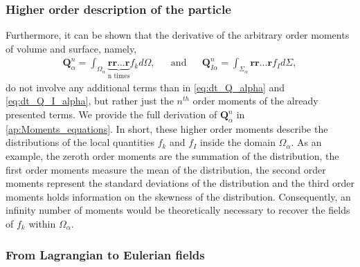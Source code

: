 \subsubsection*{Higher order description of the particle}
Furthermore, it can be shown that the derivative of the arbitrary order moments of volume and surface, namely,
\begin{align}
    \textbf{Q}_\alpha^n
    = \int_{\Omega_\alpha} \underbrace{
        \textbf{r}\textbf{r}\ldots\textbf{r}
    }_{
        \text{n times}
    }
    f_k d\Omega,
    && \text{and} &&
    \textbf{Q}_{I\alpha}^n
    = \int_{\Sigma_\alpha}
        \textbf{r}\textbf{r}\ldots\textbf{r}
    f_I d\Sigma,
    \label{eq:Q_n_definition}
\end{align} 
do not involve any additional terms than in \ref{eq:dt_Q_alpha} and \ref{eq:dt_Q_I_alpha}, but rather just the $n^{th}$ order moments of the already presented terms.
We provide the full derivation of $\textbf{Q}_\alpha^n$ in \ref{ap:Moments_equations}.
In short, these higher order moments describe the distributions of the local quantities $f_k$ and $f_I$ inside the domain $\Omega_\alpha$.
As an example, the zeroth order moments are the summation of the distribution, the first order moments measure the mean of the distribution, the second order moments represent the standard deviations of the distribution and the third order moments holds information on the skewness of the distribution. 
Consequently, an infinity number of moments would be theoretically necessary to recover the fields of $f_k$ within $\Omega_\alpha$. 


\subsubsection*{From Lagrangian to Eulerian fields}

